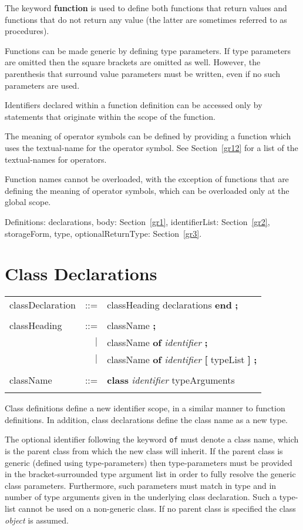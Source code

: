 The keyword {\bf function} is used to define both functions that
return values and functions that do not return any value (the latter
are sometimes referred to as procedures).

Functions can be made generic by defining type parameters.
If type parameters are omitted then the square brackets are omitted
as well.  However, the parenthesis that surround value parameters
must be written, even if no such parameters are used.

Identifiers declared within a function definition can be accessed only
by statements that originate within the scope of the function.

The meaning of operator symbols can be defined by providing
a function which uses the textual-name for the operator symbol.
See Section~\ref{gr12} for a list of the textual-names for operators.

Function names cannot be overloaded, with the exception of
functions that are defining the meaning of operator symbols, which can
be overloaded only at the global scope.

Definitions:
declarations, body: Section~\ref{gr1},
identifierList: Section~\ref{gr2},
storageForm, type, optionalReturnType: Section~\ref{gr3}.

\section{Class Declarations}\label{gr5}

\begin{tabular}{l r l}
classDeclaration & ::= & classHeading declarations {\bf end} {\bf ;} \\ \\
classHeading & ::= & className {\bf ;} \\
& $\mid$ & className {\bf of} {\em identifier} {\bf ;} \\
& $\mid$ & className {\bf of} {\em identifier} {\bf [} typeList {\bf ]} {\bf ;} \\ \\
className & ::= & {\bf class} {\em identifier} typeArguments \\ \\
\end{tabular}

Class definitions define a new identifier scope, in a similar manner to function
definitions.  In addition, class declarations define the class name
as a new type.

The optional identifier following the keyword {\tt of} must denote
a class name, which is the parent class from which the new class
will inherit.
If the parent class is generic (defined using type-parameters)
then type-parameters must be provided in the bracket-surrounded type argument
list in order to fully resolve the generic class parameters.
Furthermore, such parameters must match in type and in number of
type arguments given in the underlying class declaration.
Such a type-list cannot be used on a non-generic
class.  If no parent class is specified the class {\em object} is assumed.

